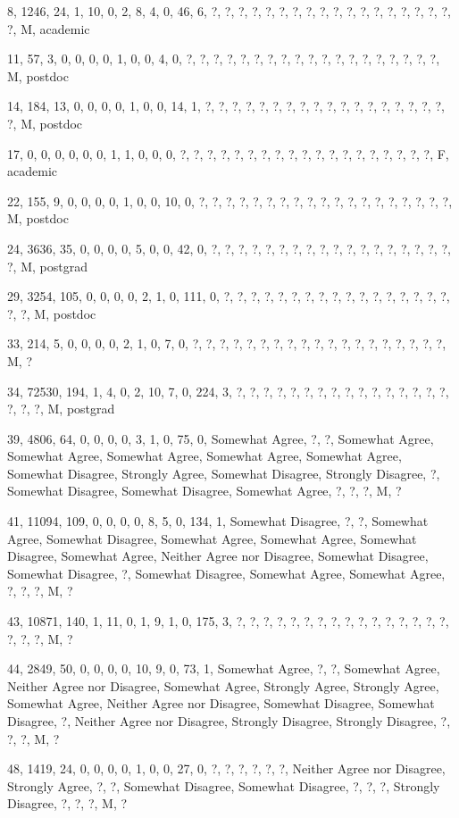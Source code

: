 \documentclass[12pt,twoside]{article}
\begin{document}
8, 1246, 24, 1, 10, 0, 2, 8, 4, 0, 46, 6, ?, ?, ?, ?, ?, ?, ?, ?, ?, ?,
?, ?, ?, ?, ?, ?, ?, ?, ?, M, academic

11, 57, 3, 0, 0, 0, 0, 1, 0, 0, 4, 0, ?, ?, ?, ?, ?, ?, ?, ?, ?, ?, ?,
?, ?, ?, ?, ?, ?, ?, ?, M, postdoc

14, 184, 13, 0, 0, 0, 0, 1, 0, 0, 14, 1, ?, ?, ?, ?, ?, ?, ?, ?, ?, ?,
?, ?, ?, ?, ?, ?, ?, ?, ?, M, postdoc

17, 0, 0, 0, 0, 0, 0, 1, 1, 0, 0, 0, ?, ?, ?, ?, ?, ?, ?, ?, ?, ?, ?, ?,
?, ?, ?, ?, ?, ?, ?, F, academic

22, 155, 9, 0, 0, 0, 0, 1, 0, 0, 10, 0, ?, ?, ?, ?, ?, ?, ?, ?, ?, ?, ?,
?, ?, ?, ?, ?, ?, ?, ?, M, postdoc

24, 3636, 35, 0, 0, 0, 0, 5, 0, 0, 42, 0, ?, ?, ?, ?, ?, ?, ?, ?, ?, ?,
?, ?, ?, ?, ?, ?, ?, ?, ?, M, postgrad

29, 3254, 105, 0, 0, 0, 0, 2, 1, 0, 111, 0, ?, ?, ?, ?, ?, ?, ?, ?, ?,
?, ?, ?, ?, ?, ?, ?, ?, ?, ?, M, postdoc

33, 214, 5, 0, 0, 0, 0, 2, 1, 0, 7, 0, ?, ?, ?, ?, ?, ?, ?, ?, ?, ?, ?,
?, ?, ?, ?, ?, ?, ?, ?, M, ?

34, 72530, 194, 1, 4, 0, 2, 10, 7, 0, 224, 3, ?, ?, ?, ?, ?, ?, ?, ?, ?,
?, ?, ?, ?, ?, ?, ?, ?, ?, ?, M, postgrad

39, 4806, 64, 0, 0, 0, 0, 3, 1, 0, 75, 0, Somewhat Agree, ?, ?, Somewhat
Agree, Somewhat Agree, Somewhat Agree, Somewhat Agree, Somewhat Agree,
Somewhat Disagree, Strongly Agree, Somewhat Disagree, Strongly
Disagree, ?, Somewhat Disagree, Somewhat Disagree, Somewhat Agree, ?,
?, ?, M, ?

41, 11094, 109, 0, 0, 0, 0, 8, 5, 0, 134, 1, Somewhat Disagree, ?, ?,
Somewhat Agree, Somewhat Disagree, Somewhat Agree, Somewhat Agree,
Somewhat Disagree, Somewhat Agree, Neither Agree nor Disagree, Somewhat
Disagree, Somewhat Disagree, ?, Somewhat Disagree, Somewhat Agree,
Somewhat Agree, ?, ?, ?, M, ?

43, 10871, 140, 1, 11, 0, 1, 9, 1, 0, 175, 3, ?, ?, ?, ?, ?, ?, ?, ?, ?,
?, ?, ?, ?, ?, ?, ?, ?, ?, ?, M, ?

44, 2849, 50, 0, 0, 0, 0, 10, 9, 0, 73, 1, Somewhat Agree, ?, ?,
Somewhat Agree, Neither Agree nor Disagree, Somewhat Agree, Strongly
Agree, Strongly Agree, Somewhat Agree, Neither Agree nor Disagree,
Somewhat Disagree, Somewhat Disagree, ?, Neither Agree nor Disagree,
Strongly Disagree, Strongly Disagree, ?, ?, ?, M, ?

48, 1419, 24, 0, 0, 0, 0, 1, 0, 0, 27, 0, ?, ?, ?, ?, ?, ?, Neither
Agree nor Disagree, Strongly Agree, ?, ?, Somewhat Disagree, Somewhat
Disagree, ?, ?, ?, Strongly Disagree, ?, ?, ?, M, ?
\end{document}
